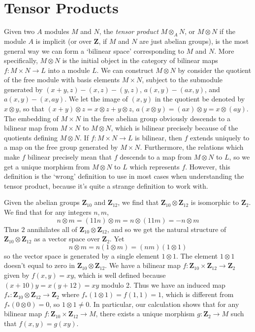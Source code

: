 \section{Tensor Products}

Given two $A$ modules $M$ and $N$, the \emph{tensor product} $M \otimes_A N$, or $M \otimes N$ if the module $A$ is implicit (or over $\mathbf{Z}$, if $M$ and $N$ are just abelian groups), is the most general way we can form a `bilinear space' corresponding to $M$ and $N$. More specifically, $M \otimes N$ is the initial object in the category of bilinear maps $f: M \times N \to L$ into a module $L$. We can construct $M \otimes N$ by consider the quotient of the free module with basis elements $M \times N$, subject to the submodule generated by $(x + y, z) - (x,z) - (y,z)$, $a(x,y) - (ax,y)$, and $a(x,y) - (x,ay)$. We let the image of $(x,y)$ in the quotient be denoted by $x \otimes y$, so that $(x + y) \otimes z = x \otimes z + y \otimes z$, $a(x \otimes y) = (ax) \otimes y = x \otimes (ay)$. The embedding of $M \times N$ in the free abelian group obviously descends to a bilinear map from $M \times N$ to $M \otimes N$, which is bilinear precisely because of the quotients defining $M \otimes N$. If $f: M \times N \to L$ is bilinear, then $f$ extends uniquely to a map on the free group generated by $M \times N$. Furthermore, the relations which make $f$ bilinear precisely mean that $f$ descends to a map from $M \otimes N$ to $L$, so we get a unique morphism from $M \otimes N$ to $L$ which represents $f$. However, this definition is the `wrong' definition to use in most cases when understanding the tensor product, because it's quite a strange definition to work with.

\begin{example}
    Given the abelian groups $\mathbf{Z}_{10}$ and $\mathbf{Z}_{12}$, we find that $\mathbf{Z}_{10} \otimes \mathbf{Z}_{12}$ is isomorphic to $\mathbf{Z}_2$. We find that for any integers $n,m$,
    \[ n \otimes m = (11n) \otimes m = n \otimes (11m) = - n \otimes m \]
    Thus $2$ annihilates all of $\mathbf{Z}_{10} \otimes \mathbf{Z}_{12}$, and so we get the natural structure of $\mathbf{Z}_{10} \otimes \mathbf{Z}_{12}$ as a vector space over $\mathbf{Z}_2$. Yet
    \[ n \otimes m = n(1 \otimes m) = (nm)(1 \otimes 1) \]
    so the vector space is generated by a single element $1 \otimes 1$. The element $1 \otimes 1$ doesn't equal to zero in $\mathbf{Z}_{10} \otimes \mathbf{Z}_{12}$. We have a bilinear map $f: \mathbf{Z}_{10} \times \mathbf{Z}_{12} \to \mathbf{Z}_2$ given by $f(x,y) = xy$, which is well defined because $(x + 10)y = x(y + 12) = xy$ modulo 2. Thus we have an induced map $f_*: \mathbf{Z}_{10} \otimes \mathbf{Z}_{12} \to \mathbf{Z}_2$ where $f_*(1 \otimes 1) = f(1,1) = 1$, which is different from $f_*(0 \otimes 0) = 0$, so $1 \otimes 1 \neq 0$. In particular, our calculation shows that for any bilinear map $f: \mathbf{Z}_{10} \times \mathbf{Z}_{12} \to M$, there exists a unique morphism $g: \mathbf{Z}_2 \to M$ such that $f(x,y) = g(xy)$.
\end{example}

